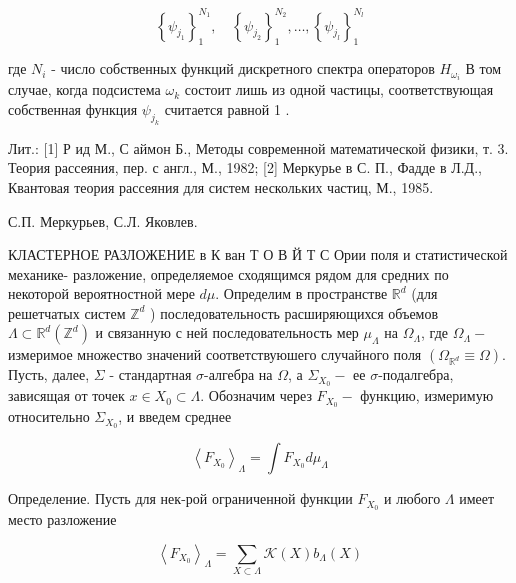 \documentclass[10pt]{article}
\begin{document}
\[

\left\{\psi_{j_{1}}\right\}_{1}^{N_{1}}, \quad\left\{\psi_{j_{2}}\right\}_{1}^{N_{2}}, \ldots,\left\{\psi_{j_{l}}\right\}_{1}^{N_{l}}

\]



где $N_{i}$ - число собственных функций дискретного спектра операторов $H_{\omega_{i}}$ В том случае, когда подсистема $\omega_{k}$ состоит лишь из одной частицы, соответствующая собственная функция $\psi_{j_{k}}$ считается равной 1 .



Лит.: [1] Р ид М., С аймон Б., Методы современной математической физики, т. 3. Теория рассеяния, пер. с англ., М., 1982; [2] Меркурье в С. П., Фадде в Л.Д., Квантовая теория рассеяния для систем нескольких частиц, М., 1985.



С.П. Меркурьев, С.Л. Яковлев.



КЛАСТЕРНОЕ РАЗЛОЖЕНИЕ в К ван Т О В Й Т С Ории поля и статистической механике- разложение, определяемое сходящимся рядом для средних по некоторой вероятностной мере $d \mu$. Определим в пространстве $\mathbb{R}^{d}$ (для решетчатых систем $\mathbb{Z}^{d}$ ) последовательность расширяющихся объемов $\Lambda \subset \mathbb{R}^{d}\left(\mathbb{Z}^{d}\right)$ и связанную с ней последовательность мер $\mu_{\Lambda}$ на $\Omega_{\Lambda}$, где $\Omega_{\Lambda}-$ измеримое множество значений соответствуюшего случайного поля $\left(\Omega_{\mathbb{R}^{d}} \equiv \Omega\right)$. Пусть, далее, $\Sigma$ - стандартная $\sigma$-алгебра на $\Omega$, а $\Sigma_{X_{0}}-$ ее $\sigma$-подалгебра, зависящая от точек $x \in X_{0} \subset \Lambda$. Обозначим через $F_{X_{0}}-$ функцию, измеримую относительно $\Sigma_{X_{0}}$, и введем среднее



\[

\left\langle F_{X_{0}}\right\rangle_{\Lambda}=\int F_{X_{0}} d \mu_{\Lambda}

\]



Определение. Пусть для нек-рой ограниченной функции $F_{X_{0}}$ и любого $\Lambda$ имеет место разложение



\[

\left\langle F_{X_{0}}\right\rangle_{\Lambda}=\sum_{X \subset \Lambda} \mathscr{K}(X) b_{\Lambda}(X)

\]
\end{document}
